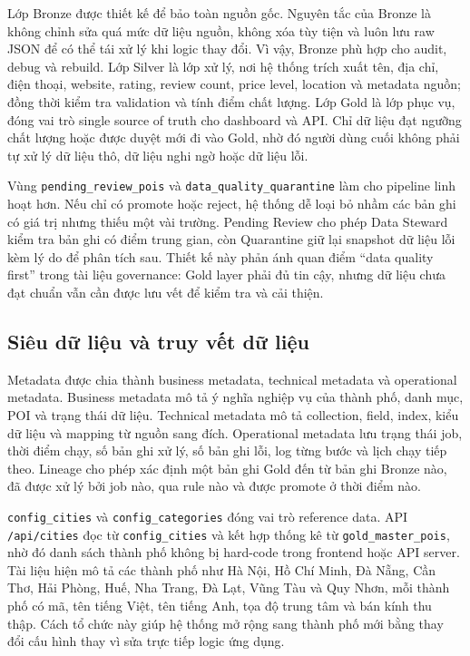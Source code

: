 \documentclass[12pt,a4paper]{article}
\begin{document}
Lớp Bronze được thiết kế để bảo toàn nguồn gốc. Nguyên tắc của Bronze là không chỉnh sửa quá mức dữ liệu nguồn, không xóa tùy tiện và luôn lưu raw JSON để có thể tái xử lý khi logic thay đổi. Vì vậy, Bronze phù hợp cho audit, debug và rebuild. Lớp Silver là lớp xử lý, nơi hệ thống trích xuất tên, địa chỉ, điện thoại, website, rating, review count, price level, location và metadata nguồn; đồng thời kiểm tra validation và tính điểm chất lượng. Lớp Gold là lớp phục vụ, đóng vai trò single source of truth cho dashboard và API. Chỉ dữ liệu đạt ngưỡng chất lượng hoặc được duyệt mới đi vào Gold, nhờ đó người dùng cuối không phải tự xử lý dữ liệu thô, dữ liệu nghi ngờ hoặc dữ liệu lỗi.

Vùng \texttt{pending\_review\_pois} và \texttt{data\_quality\_quarantine} làm cho pipeline linh hoạt hơn. Nếu chỉ có promote hoặc reject, hệ thống dễ loại bỏ nhầm các bản ghi có giá trị nhưng thiếu một vài trường. Pending Review cho phép Data Steward kiểm tra bản ghi có điểm trung gian, còn Quarantine giữ lại snapshot dữ liệu lỗi kèm lý do để phân tích sau. Thiết kế này phản ánh quan điểm ``data quality first'' trong tài liệu governance: Gold layer phải đủ tin cậy, nhưng dữ liệu chưa đạt chuẩn vẫn cần được lưu vết để kiểm tra và cải thiện.

\subsection{Siêu dữ liệu và truy vết dữ liệu}

Metadata được chia thành business metadata, technical metadata và operational metadata. Business metadata mô tả ý nghĩa nghiệp vụ của thành phố, danh mục, POI và trạng thái dữ liệu. Technical metadata mô tả collection, field, index, kiểu dữ liệu và mapping từ nguồn sang đích. Operational metadata lưu trạng thái job, thời điểm chạy, số bản ghi xử lý, số bản ghi lỗi, log từng bước và lịch chạy tiếp theo. Lineage cho phép xác định một bản ghi Gold đến từ bản ghi Bronze nào, đã được xử lý bởi job nào, qua rule nào và được promote ở thời điểm nào.

\texttt{config\_cities} và \texttt{config\_categories} đóng vai trò reference data. API \texttt{/api/cities} đọc từ \texttt{config\_cities} và kết hợp thống kê từ \texttt{gold\_master\_pois}, nhờ đó danh sách thành phố không bị hard-code trong frontend hoặc API server. Tài liệu hiện mô tả các thành phố như Hà Nội, Hồ Chí Minh, Đà Nẵng, Cần Thơ, Hải Phòng, Huế, Nha Trang, Đà Lạt, Vũng Tàu và Quy Nhơn, mỗi thành phố có mã, tên tiếng Việt, tên tiếng Anh, tọa độ trung tâm và bán kính thu thập. Cách tổ chức này giúp hệ thống mở rộng sang thành phố mới bằng thay đổi cấu hình thay vì sửa trực tiếp logic ứng dụng.
\end{document}

